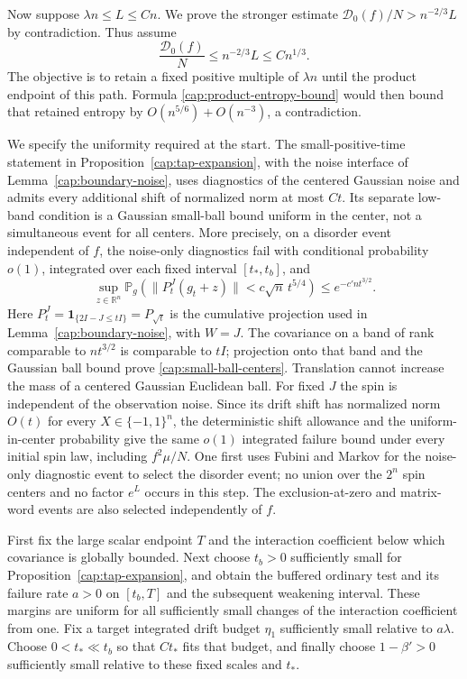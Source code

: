 Now suppose $\lambda n\le L\le Cn$.  We prove the stronger estimate
$\mathcal D_0(f)/N>n^{-2/3}L$ by contradiction.  Thus assume
\begin{equation}\label{cap:large-entropy-assumption}
 \frac{\mathcal D_0(f)}N\le n^{-2/3}L\le Cn^{1/3}.
\end{equation}
The objective is to retain a fixed positive multiple of $\lambda n$ until the
product endpoint of this path. Formula \eqref{cap:product-entropy-bound} would
then bound that retained entropy by $O(n^{5/6})+O(n^{-3})$, a contradiction.

We specify the uniformity required at the start. The small-positive-time
statement in Proposition~\ref{cap:tap-expansion}, with the noise interface of
Lemma~\ref{cap:boundary-noise}, uses diagnostics of the centered Gaussian
noise and admits every additional shift of normalized norm at most $Ct$. Its
separate low-band condition is a Gaussian small-ball bound uniform in the
center, not a simultaneous event for all centers. More precisely, on a
disorder event independent of $f$, the noise-only diagnostics fail with
conditional probability $o(1)$, integrated over each fixed interval
$[t_*,t_b]$, and
\begin{equation}\label{cap:small-ball-centers}
 \sup_{z\in\mathbb R^n}
 \mathbb P_g\!\left(
   \|P_t^J(g_t+z)\|<c\sqrt n\,t^{5/4}\right)
 \le e^{-c'nt^{3/2}}.
\end{equation}
Here $P_t^J=\mathbf1_{\{2I-J\le tI\}}=P_{\sqrt t}$ is the cumulative
projection used in Lemma~\ref{cap:boundary-noise}, with $W=J$.
The covariance on a band of rank comparable to $nt^{3/2}$ is comparable to
$tI$; projection onto that band and the Gaussian ball bound prove
\eqref{cap:small-ball-centers}. Translation cannot increase the mass of a
centered Gaussian Euclidean ball. For fixed $J$ the spin is independent of the
observation noise. Since its drift shift has normalized norm $O(t)$ for every
$X\in\{-1,1\}^n$, the deterministic shift allowance and the uniform-in-center
probability give the same $o(1)$ integrated failure bound under every initial
spin law, including $f^2\mu/N$. One first uses Fubini and Markov for the
noise-only diagnostic event to select the disorder event; no union over the
$2^n$ spin centers and no factor $e^L$ occurs in this step. The
exclusion-at-zero and matrix-word events are also selected independently of
$f$.

First fix the large scalar endpoint $T$ and the interaction coefficient below
which covariance is globally bounded. Next choose $t_b>0$ sufficiently small
for Proposition~\ref{cap:tap-expansion}, and obtain the buffered ordinary test
and its failure rate $a>0$ on $[t_b,T]$ and the subsequent weakening interval.
These margins are uniform for all sufficiently small changes of the
interaction coefficient from one. Fix a target integrated drift budget
$\eta_1$ sufficiently small relative to $a\lambda$. Choose $0<t_*\ll t_b$ so
that $Ct_*$ fits that budget, and finally choose $1-\beta'>0$ sufficiently
small relative to these fixed scales and $t_*$.

